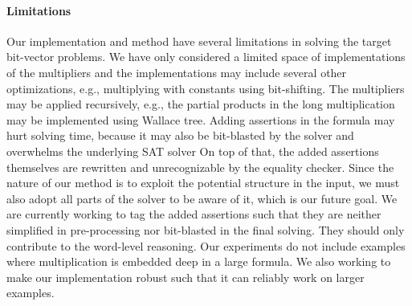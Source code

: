 \paragraph{\bf Limitations}
%
Our implementation and method have several limitations
in solving the target bit-vector problems.
%
We have only considered a limited space of implementations of the
multipliers and the implementations may include several other
optimizations, e.g., multiplying with constants using bit-shifting.
%
The multipliers may be applied recursively, e.g.,
the partial products in the long multiplication may be
implemented using Wallace tree.
%
Adding assertions in the formula may hurt solving time, because
it may also be bit-blasted by the solver and overwhelms
the underlying SAT solver
%
On top of that, the added assertions themselves are rewritten and
unrecognizable by the equality checker.
%
Since the nature of our method is to exploit the potential
structure in the input, we must also adopt all parts of the solver
to be aware of it, which is our future goal.
%
We are currently working to tag the added assertions such that they
are neither simplified in pre-processing nor bit-blasted in the final
solving.
%
They should only contribute to the word-level reasoning.
%
Our experiments do not include examples where multiplication
is embedded deep in a large formula.
%
We also working to make our implementation robust such that
it can reliably work on larger examples.







